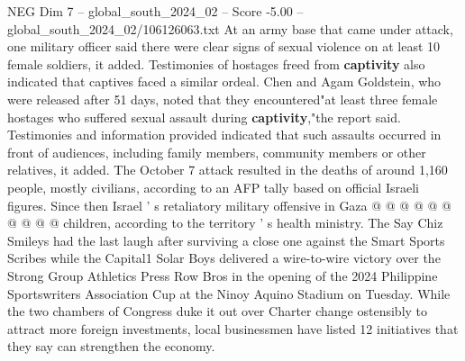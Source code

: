 \begin{textsample}{NEG Dim 7 – global\_south\_2024\_02 – Score -5.00 – global\_south\_2024\_02/106126063.txt}
At an army base that came under attack, one military officer said there were clear signs of sexual violence on at least 10 female soldiers, it added.
Testimonies of hostages freed from \textbf{captivity} also indicated that captives faced a similar ordeal.
Chen and Agam Goldstein, who were released after 51 days, noted that they encountered"at least three female hostages who suffered sexual assault during \textbf{captivity},"the report said.
Testimonies and information provided indicated that such assaults occurred in front of audiences, including family members, community members or other relatives, it added.
The October 7 attack resulted in the deaths of around 1,160 people, mostly civilians, according to an AFP tally based on official Israeli figures.
Since then Israel ' s retaliatory military offensive in Gaza @ @ @ @ @ @ @ @ @ @ children, according to the territory ' s health ministry.
The Say Chiz Smileys had the last laugh after surviving a close one against the Smart Sports Scribes while the Capital1 Solar Boys delivered a wire-to-wire victory over the Strong Group Athletics Press Row Bros in the opening of the 2024 Philippine Sportswriters Association Cup at the Ninoy Aquino Stadium on Tuesday.
While the two chambers of Congress duke it out over Charter change ostensibly to attract more foreign investments, local businessmen have listed 12 initiatives that they say can strengthen the economy.

\end{textsample}
